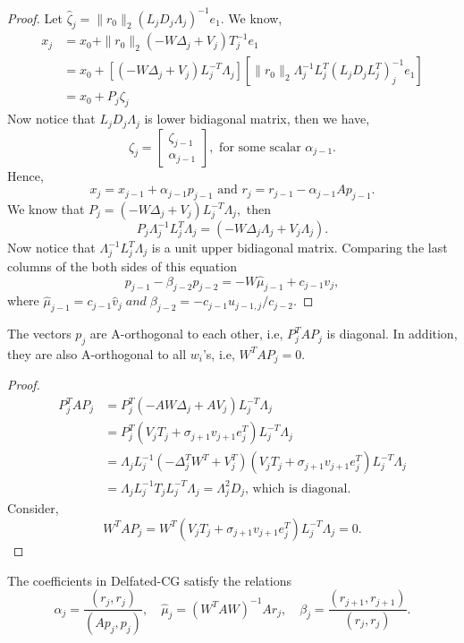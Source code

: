 \documentclass[10pt,a4paper]{article}
\begin{document}
\begin{proof}
Let $\hat{\zeta}_j=\|r_0\|_2(L_jD_j\Lambda_j)^{-1}e_1$. We know,
\begin{align*}
x_j&=x_0+\|r_0\|_2(-W\Delta_j+V_j)T^{-1}_je_1\\
&=x_0+[(-W\Delta_j+V_j)L^{-T}_j\Lambda_j][\|r_0\|_2\Lambda^{-1}_jL^{T}_j(L_jD_jL^T_j)^{-1}_je_1] \\
&= x_0+P_j\zeta_j
\end{align*}
Now notice that $L_jD_j\Lambda_j$ is lower bidiagonal matrix, then we have,
$$\zeta_j=\left[ \begin{array}{c} \zeta_{j-1} \\ \alpha_{j-1} \end{array} \right],\text{ for some scalar }\alpha_{j-1}.$$
Hence, $$x_j = x_{j-1}+\alpha_{j-1}p_{j-1}\text{ and }r_j = r_{j-1}-\alpha_{j-1}Ap_{j-1}.$$
We know that $P_j=(-W\Delta_j+V_j)L^{-T}_j\Lambda_j,$ then 
$$P_j\Lambda^{-1}_jL^{T}_j\Lambda_j=(-W\Delta_j\Lambda_j+V_j\Lambda_j).$$
Now notice that $\Lambda^{-1}_jL^{T}_j\Lambda_j$ is a unit upper bidiagonal matrix. Comparing the last columns of the both sides of this equation 
$$p_{j-1}-\beta_{j-2}p_{j-2}=-W\hat{\mu}_{j-1}+c_{j-1}v_j,$$
where $\hat{\mu}_{j-1}=c_{j-1}\hat{v}_j\;and\;\beta_{j-2}=-c_{j-1}u_{j-1,j}/c_{j-2}.$
\end{proof}

\begin{proposition}
The vectors $p_j$ are A-orthogonal to each other, i.e, $P^T_jAP_j$ is diagonal. In addition, they are also A-orthogonal to all $w_i$'s, i.e, $W^TAP_j=0.$
\end{proposition}

\begin{proof}
\begin{align*}
P^T_jAP_j&= P^T_j(-AW\Delta_j+AV_j)L^{-T}_j\Lambda_j \\
&= P^T_j(V_jT_j+\sigma_{j+1}v_{j+1}e^T_j)L^{-T}_j\Lambda_j \\
&= \Lambda_jL^{-1}_j(-\Delta^T_jW^T+V^T_j)(V_jT_j+\sigma_{j+1}v_{j+1}e^T_j)L^{-T}_j\Lambda_j \\
&= \Lambda_jL^{-1}_jT_jL^{-T}_j\Lambda_j = \Lambda^2_jD_j\text{, which is diagonal.}
\end{align*}
Consider, 
$$W^TAP_j=W^T(V_jT_j+\sigma_{j+1}v_{j+1}e^T_j)L^{-T}_j\Lambda_j=0.$$
\end{proof}

\begin{proposition}
The coefficients in Delfated-CG satisfy the relations
$$\alpha_j=\dfrac{(r_j,r_j)}{(Ap_j,p_j)},\quad \hat{\mu}_j=(W^TAW)^{-1}Ar_j,\quad \beta_j=\dfrac{(r_{j+1},r_{j+1})}{(r_j,r_j)}.$$
\end{proposition}
\end{document}
